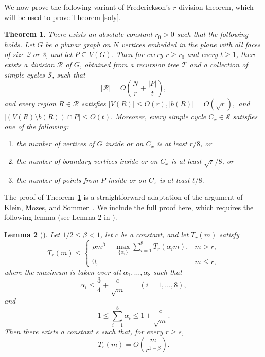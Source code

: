 \documentclass[11pt]{article}
\theoremstyle{plain}
\newtheorem{theorem}{Theorem}[section]
\newtheorem{lemma}[theorem]{Lemma}
\theoremstyle{definition}
\theoremstyle{remark}
\begin{document}
  
  
  
  
  
  
  
  
  
  
  
  We now prove the following variant of Frederickson's $r$-division theorem, which will be used to prove Theorem \ref{soly}.


\begin{theorem}\label{rdiv}
There exists an absolute constant $r_0>0$ such that the following holds. Let $G$ be a planar graph on $N$ vertices embedded in the plane with all faces of size 2 or 3, and let $P \subseteq V(G)$.  Then for every $r \ge r_0$ and every $t \ge 1$, there exists a division $\mathcal R$ of $G$, obtained from a recursion tree $\mathcal T$ and a collection of simple cycles $\mathcal S$, such that
\[
|\mathcal{R}| = O\!\left(\frac{N}{r} + \frac{|P|}{t}\right),
\]
and every region $R \in \mathcal{R}$ satisfies $|V(R)| \le O(r),
|b(R)| = O(\sqrt r),$ and $|(V(R)\setminus b(R))\cap P| \le O(t).$  Moreover, every simple cycle $C_x \in \mathcal{S}$ satisfies one of the following: 


\begin{enumerate}
     
    \item the number of vertices of $G$ inside or on $C_x$ is at least $r/8$, or

    \item the number of boundary vertices inside or on $C_x$ is at least $\sqrt{r}/8$, or

    \item the number of points from $P$ inside or on $C_x$ is at least $t/8.$
 \end{enumerate}
\end{theorem}


The proof of Theorem~\ref{rdiv} is a straightforward adaptation of the argument of Klein, Mozes, and Sommer~\cite{KMS13}.  We include the full proof here, which requires the following lemma (see Lemma 2 in \cite{KMS13}).

\begin{lemma}[\cite{KMS13}]\label{lem:KMS-recurrence}
Let \(1/2\le \beta<1\), let \(c\) be a constant, and let \(T_r(m)\) satisfy
\[
T_r(m)\le
\begin{cases}
\rho m^\beta+\max\limits_{\{\alpha_i\}}\sum_{i=1}^8 T_r(\alpha_i m), & m>r,\\[4pt]
0, & m\le r,
\end{cases}
\]
where the maximum is taken over all \(\alpha_1,\dots,\alpha_8\) such that
\[
\alpha_i\le \frac34+\frac{c}{\sqrt m}\qquad (i=1,\dots,8),
\]
and
\[
1\le \sum_{i=1}^8 \alpha_i \le 1+\frac{c}{\sqrt m}.
\]
Then there exists a constant \(s\) such that, for every \(r\ge s\),
\[
T_r(m)=O\!\left(\frac{m}{r^{1-\beta}}\right).
\]
\end{lemma}
\end{document}
